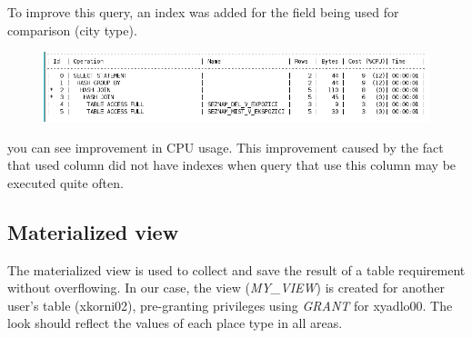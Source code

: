 \documentclass[12pt,a4paper]{article}
\begin{document}
\noindent To improve this query, an index was added for the field being used 
for comparison (city type).

\begin{figure}[h!]
    \centering
    \includegraphics[width=\textwidth,height=\textheight,keepaspectratio]
    {new_explain_plan.png}
\end{figure}

\noindent you can see improvement in CPU usage. This improvement caused by the 
fact that used column did not have indexes when query that use this column may 
be executed quite  often.   

\subsection{Materialized view}

The materialized view is used to collect and save the result of a table 
requirement without overflowing. In our case, the view (\textit{MY\_VIEW}) is 
created for another user's table (xkorni02), pre-granting privileges using 
\textit{GRANT} for xyadlo00. The look should reflect the values of each place 
type in all areas.
\end{document}

